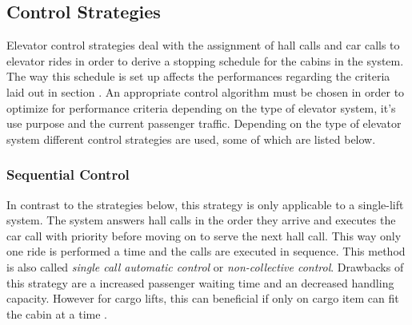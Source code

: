 

\subsection{Control Strategies}
\label{sec:sota:strategies}

Elevator control strategies deal with the assignment of hall calls and car calls to elevator rides in order to derive a stopping schedule for the cabins in the system.
The way this schedule is set up affects
the performances regarding the criteria laid out in section \label{sota:sec:perf}.
An appropriate control algorithm must be chosen in order to optimize for performance criteria
depending on the type of elevator system, it's use purpose and the current passenger traffic.
Depending on the type of elevator system different control strategies are used, some of which are listed below.

\subsubsection{Sequential Control}
In contrast to the strategies below, 
this strategy is only applicable to a single-lift system.
The system answers hall calls in the order they arrive 
and executes the car call with priority before moving on to serve the next hall call.
This way only one ride is performed a time and the calls are executed in sequence. This method is also called \emph{single call automatic control} or \emph{non-collective control}.
Drawbacks of this strategy are a increased passenger waiting time and an decreased handling capacity.
However for cargo lifts, this can beneficial if only on cargo item can fit the cabin at a time
\autocite[][p.~238]{barney2016handbook}.

